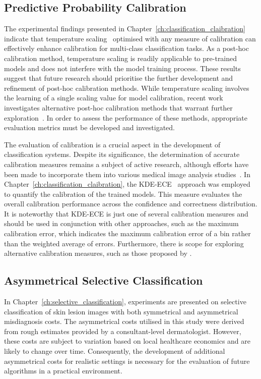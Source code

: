 \subsection{Predictive Probability Calibration}
The experimental findings presented in Chapter~\ref{ch:classification_claibration} indicate that temperature scaling~\citep{guo2017calibration} optimised with any measure of calibration can effectively enhance calibration for multi-class classification tasks. As a post-hoc calibration method, temperature scaling is readily applicable to pre-trained models and does not interfere with the model training process. These results suggest that future research should prioritise the further development and refinement of post-hoc calibration methods. While temperature scaling involves the learning of a single scaling value for model calibration, recent work investigates alternative post-hoc calibration methods that warrant further exploration~\citep{song2021classifier}. In order to assess the performance of these methods, appropriate evaluation metrics must be developed and investigated.

The evaluation of calibration is a crucial aspect in the development of classification systems. Despite its significance, the determination of accurate calibration measures remains a subject of active research, although efforts have been made to incorporate them into various medical image analysis studies~\citep{maier2022metrics}. In Chapter~\ref{ch:classification_claibration}, the KDE-ECE~\citep{zhang2020mix} approach was employed to quantify the calibration of the trained models. This measure evaluates the overall calibration performance across the confidence and correctness distribution. It is noteworthy that KDE-ECE is just one of several calibration measures and should be used in conjunction with other approaches, such as the maximum calibration error, which indicates the maximum calibration error of a bin rather than the weighted average of errors. Furthermore, there is scope for exploring alternative calibration measures, such as those proposed by \cite{nixon2019measuring}.

\subsection{Asymmetrical Selective Classification}
In Chapter~\ref{ch:selective_classification}, experiments are presented on selective classification of skin lesion images with both symmetrical and asymmetrical misdiagnosis costs. The asymmetrical costs utilised in this study were derived from rough estimates provided by a consultant-level dermatologist. However, these costs are subject to variation based on local healthcare economics and are likely to change over time. Consequently, the development of additional asymmetrical costs for realistic settings is necessary for the evaluation of future algorithms in a practical environment.

